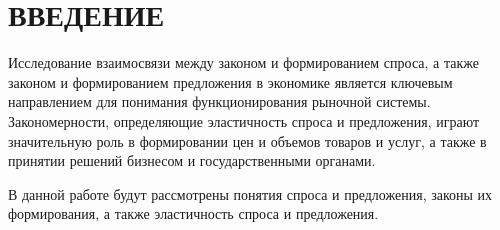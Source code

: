 \chapter*{ВВЕДЕНИЕ}

Исследование взаимосвязи между законом и формированием спроса, а также законом и формированием предложения в экономике является ключевым направлением для понимания функционирования рыночной системы. 
Закономерности, определяющие эластичность спроса и предложения, играют значительную роль в формировании цен и объемов товаров и услуг, а также в принятии решений бизнесом и государственными органами.

В данной работе будут рассмотрены понятия спроса и предложения, законы их формирования, а также эластичность спроса и предложения.
